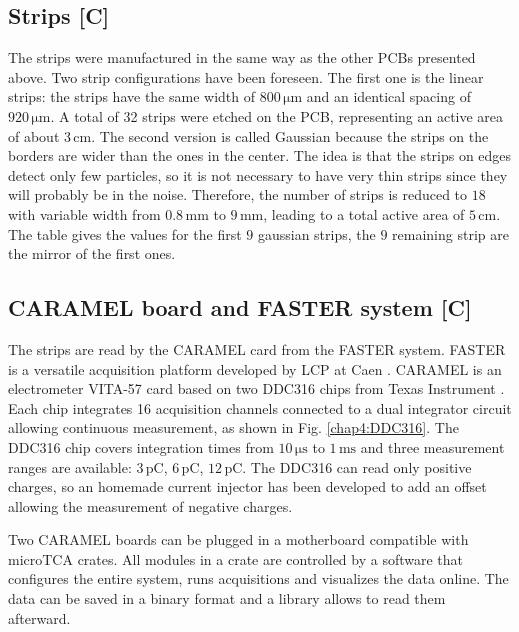 \begin{refsection}
  \subsection{Strips [C]}
  The strips were manufactured in the same way as the other PCBs presented above. Two strip configurations have been foreseen. The first one is the linear strips: the strips have the same width of $800\,\mathrm{\mu m}$ and an identical spacing of $920\,\mathrm{\mu m}$. A total of 32 strips were etched on the PCB, representing an active area of about $3\,\mathrm{cm}$. The second version is called Gaussian because the strips on the borders are wider than the ones in the center. The idea is that the strips on edges detect only few particles, so it is not necessary to have very thin strips since they will probably be in the noise. Therefore, the number of strips is reduced to $18$ with variable width from $0.8\,\mathrm{mm}$ to $9\,\mathrm{mm}$, leading to a total active area of $5\,\mathrm{cm}$. The table gives the values for the first $9$ gaussian strips, the $9$ remaining strip are the mirror of the first ones.

  

  \subsection{CARAMEL board and FASTER system [C]}

  The strips are read by the CARAMEL card \cite{caramel2013} from the FASTER system. FASTER is a versatile  acquisition platform developed by LCP at Caen \cite{faster2013}. CARAMEL is an electrometer VITA-57 card based on two DDC316 chips from Texas Instrument \cite{ddc316}. Each chip integrates 16 acquisition channels connected to a dual integrator circuit allowing continuous measurement, as shown in Fig. \ref{chap4:DDC316}. The DDC316 chip covers integration times from $10\,\mathrm{\mu s}$ to $1\,\mathrm{ms}$ and three measurement ranges are available: $3\,\mathrm{pC}$, $6\,\mathrm{pC}$, $12\,\mathrm{pC}$. The DDC316 can read only positive charges, so an homemade current injector has been developed to add an offset allowing the measurement of negative charges.
  

  Two CARAMEL boards can be plugged in a motherboard compatible with microTCA crates. All modules in a crate are controlled by a software that configures the entire system, runs acquisitions and visualizes \cite{rhb2012} the data online. The data can be saved in a binary format and a library allows to read them afterward.


\end{refsection}
